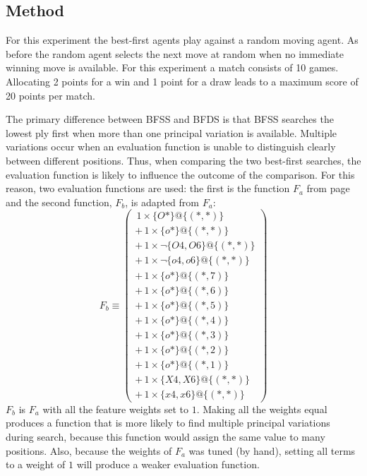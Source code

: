 \subsection*{Method}
For this experiment the best-first agents play  against a random moving agent.  As before the random agent selects the next move at random when no immediate winning move is available.  For this experiment a match consists of 10 games.  Allocating 2 points for a win and 1 point for a draw leads to a maximum score of 20 points per match.      

The primary difference between BFSS and BFDS is that BFSS searches the lowest ply first when more than one principal variation is available.  Multiple variations occur when an evaluation function is unable to distinguish clearly between different positions.  Thus, when comparing the two best-first searches, the evaluation function is likely to influence the outcome of the comparison.  For this reason, two evaluation functions are used: the first is the function $F_a$ from page \pageref{eq:tree-fa} and the second function, $F_b$, is adapted from $F_a$:  
\begin{equation}
 F_b \equiv \left( 
\begin{array}{l}
  \, 1 \times \{O*\} @ \{(*,*)\}  \\
+ \, 1 \times \{o*\} @ \{(*,*)\}  \\
+ \, 1 \times \neg \{O4,O6\} @ \{(*,*)\}  \\
+ \, 1 \times \neg \{o4,o6\} @ \{(*,*)\}  \\
+ \, 1 \times \{o*\} @ \{ (*,7) \}  \\
+	\, 1 \times \{o*\} @ \{ (*,6) \}  \\
+	\, 1 \times \{o*\} @ \{ (*,5) \} \\
+	\, 1 \times \{o*\} @ \{ (*,4) \} \\
+	\, 1 \times \{o*\} @ \{ (*,3) \} \\
+	\, 1 \times \{o*\} @ \{ (*,2) \} \\ 
+	\, 1 \times \{o*\} @ \{ (*,1) \} \\
+ \, 1 \times \{X4,X6 \} @ \{(*,*)\}  \\
+ \, 1 \times \{x4,x6 \} @ \{(*,*)\}  
\end{array}
\right)
\label{eq:tree-fb}
\end{equation}
$F_b$ is $F_a$ with all the feature weights set to $1$.  Making all the weights equal produces a function that is more likely to find multiple principal variations during search, because this function would assign the same value to many positions.  Also, because the weights of $F_a$ was tuned (by hand), setting all terms to a weight of $1$ will produce a weaker evaluation function.       

